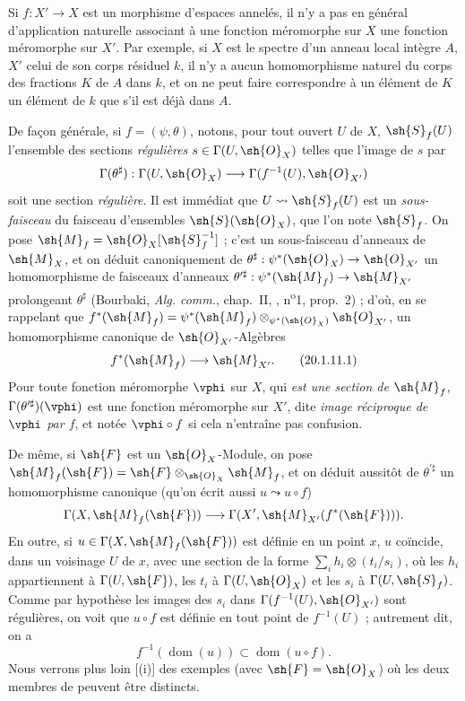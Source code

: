 \begin{env}[20.1.11]
Si $f:X'\to X$ est un morphisme d'espaces annelés, il n'y a pas en général d'application naturelle associant à une fonction méromorphe sur $X$ une fonction méromorphe sur $X'$.
Par exemple, si $X$ est le spectre d'un anneau local intègre $A$, $X'$ celui de son corps résiduel $k$, il n'y a aucun homomorphisme naturel du corps des fractions $K$ de $A$ dans $k$, et on ne peut faire correspondre à un élément de $K$ un élément de $k$ que s'il est déjà dans $A$.

De façon générale, si $f=(\psi,\theta)$, notons, pour tout ouvert $U$ de $X$, $\sh{S}_f(U)$ l'ensemble des sections \emph{régulières} $s\in\Gamma(U,\sh{O}_X)$ telles que l'image de $s$ par
\[
  \Gamma(\theta^\sharp):\Gamma(U,\sh{O}_X)\to\Gamma(f^{-1}(U),\sh{O}_{X'})
\]
soit une section \emph{régulière}.
Il est immédiat que $U\leadsto\sh{S}_f(U)$ est un \emph{sous-faisceau} du faisceau d'ensembles $\sh{S}(\sh{O}_X)$, que l'on note $\sh{S}_f$.
On pose $\sh{M}_f=\sh{O}_X[\sh{S}_f^{-1}]$ ; c'est un sous-faisceau
d'anneaux de $\sh{M}_X$, et on déduit canoniquement de $\theta^\sharp:\psi^*(\sh{O}_X)\to\sh{O}_{X'}$ un homomorphisme de faisceaux d'anneaux $\theta^{\prime\sharp}:\psi^*(\sh{M}_f)\to\sh{M}_{X'}$ prolongeant $\theta^\sharp$ (Bourbaki, \emph{Alg. comm.}, chap.~II, , n\textsuperscript{o}1, prop.~2) ; d'où, en se rappelant que $f^*(\sh{M}_f)=\psi^*(\sh{M}_f)\otimes_{\psi^*(\sh{O}_X)}\sh{O}_{X'}$, un homomorphisme canonique de $\sh{O}_{X'}$-Algèbres
\[
\label{IV.20.1.11.1}
  f^*(\sh{M}_f)\to\sh{M}_{X'}.
  \tag{20.1.11.1}
\]
Pour toute fonction méromorphe $\vphi$ sur $X$, qui \emph{est une section de $\sh{M}_f$}, $\Gamma(\theta^{\prime\sharp})(\vphi)$ est une fonction méromorphe sur $X'$, dite \emph{image réciproque de $\vphi$ par $f$}, et notée $\vphi\circ f$ si cela n'entraîne pas confusion.

De même, si $\sh{F}$ est un $\sh{O}_X$-Module, on pose $\sh{M}_f(\sh{F})=\sh{F}\otimes_{\sh{O}_X}\sh{M}_f$, et on déduit aussitôt de $\theta^{\prime\sharp}$ un homomorphisme canonique (qu'on écrit aussi $u\leadsto u\circ f$)
\[
  \Gamma(X,\sh{M}_f(\sh{F}))\to\Gamma(X',\sh{M}_{X'}(f^*(\sh{F}))).
\]
En outre, si $u\in\Gamma(X,\sh{M}_f(\sh{F}))$ est définie  en un point $x$, $u$ coïncide, dans un voisinage $U$ de $x$, avec une section de la forme $\sum_i h_i\otimes(t_i/s_i)$, où les $h_i$ appartiennent à $\Gamma(U,\sh{F})$, les $t_i$ à $\Gamma(U,\sh{O}_X)$ et les $s_i$ à $\Gamma(U,\sh{S}_f)$.
Comme par hypothèse les images des $s_i$ dans $\Gamma(f^{-1}(U),\sh{O}_{X'})$ sont régulières, on voit que $u\circ f$ est définie en tout point de $f^{-1}(U)$ ; autrement dit, on a
\[
\label{IV.20.1.11.2}
  f^{-1}(\operatorname{dom}(u))\subset\operatorname{dom}(u\circ f).
  \tag{20.1.11.2}
\]
Nous verrons plus loin [(i)] des exemples (avec $\sh{F}=\sh{O}_X$) où les deux membres de  peuvent être distincts.


\end{env}
